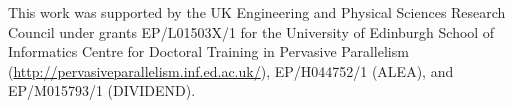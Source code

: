 \documentclass[nonatbib,preprint,nocopyrightspace,9pt]{sigplanconf}
\begin{document}
\acks

This work was supported by the UK Engineering and Physical Sciences Research
Council under grants EP/L01503X/1 for the University of Edinburgh School of
Informatics Centre for Doctoral Training in Pervasive Parallelism
(\url{http://pervasiveparallelism.inf.ed.ac.uk/}), EP/H044752/1 (ALEA), and
EP/M015793/1 (DIVIDEND).

\label{bibliography}
\printbibliography
\end{document}
